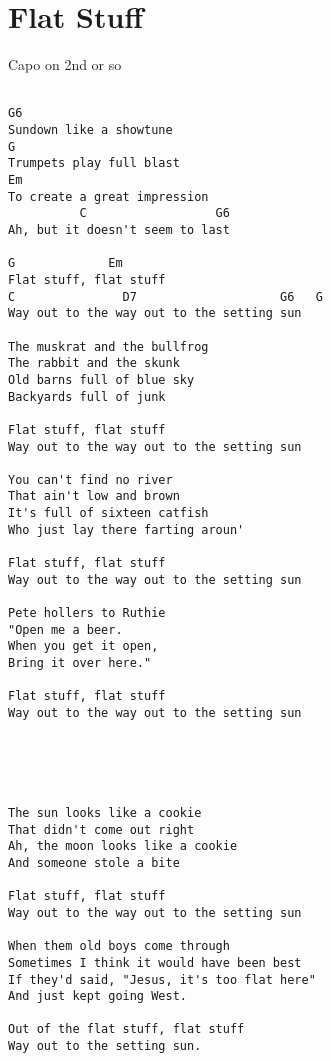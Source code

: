 \documentclass[leqno]{memoir}
\begin{document}
\chapter{Flat Stuff}
Capo on 2nd or so
\begin{verbatim}

G6
Sundown like a showtune
G
Trumpets play full blast
Em
To create a great impression
          C                  G6
Ah, but it doesn't seem to last

G             Em
Flat stuff, flat stuff
C               D7                    G6   G
Way out to the way out to the setting sun

The muskrat and the bullfrog
The rabbit and the skunk
Old barns full of blue sky
Backyards full of junk

Flat stuff, flat stuff
Way out to the way out to the setting sun

You can't find no river
That ain't low and brown
It's full of sixteen catfish
Who just lay there farting aroun'

Flat stuff, flat stuff
Way out to the way out to the setting sun

Pete hollers to Ruthie
"Open me a beer.
When you get it open,
Bring it over here."

Flat stuff, flat stuff
Way out to the way out to the setting sun





The sun looks like a cookie
That didn't come out right
Ah, the moon looks like a cookie
And someone stole a bite

Flat stuff, flat stuff
Way out to the way out to the setting sun

When them old boys come through
Sometimes I think it would have been best
If they'd said, "Jesus, it's too flat here"
And just kept going West.

Out of the flat stuff, flat stuff
Way out to the setting sun.

\end{verbatim}
\newpage
\end{document}
